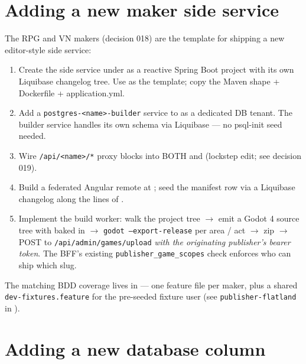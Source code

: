\section{Adding a new maker side service}

The RPG and VN makers (decision 018) are the template for shipping a
new editor-style side service:

\begin{enumerate}
  \item Create the side service under  as a
        reactive Spring Boot project with its own Liquibase changelog
        tree. Use  as the template; copy the
        Maven shape + Dockerfile + application.yml.
  \item Add a \texttt{postgres-<name>-builder} service to
         as a dedicated DB tenant. The
        builder service handles its own schema via Liquibase --- no
        psql-init seed needed.
  \item Wire \texttt{/api/<name>/*} proxy blocks into BOTH
         and
         (lockstep edit; see
        decision 019).
  \item Build a federated Angular remote at
        ; seed the
        manifest row via a Liquibase changelog along the lines of
        .
  \item Implement the build worker: walk the project tree $\rightarrow$
        emit a Godot 4 source tree with
         baked in $\rightarrow$
        \texttt{godot --export-release} per area / act $\rightarrow$
        zip $\rightarrow$ POST to \texttt{/api/admin/games/upload}
        \emph{with the originating publisher's bearer token}. The
        BFF's existing \texttt{publisher\_game\_scopes} check
        enforces who can ship which slug.
\end{enumerate}

The matching BDD coverage lives in
 --- one feature file per maker, plus a
shared \texttt{dev-fixtures.feature} for the pre-seeded fixture user
(see \texttt{publisher-flatland} in
).

\section{Adding a new database column}

